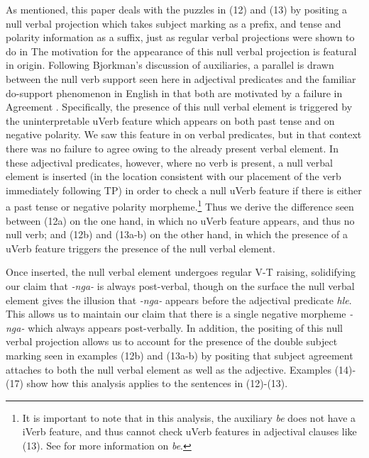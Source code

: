 \documentclass[output=paper]{langsci/langscibook}
\newcommand{\nga}[0]{\textit {-nga- }}
\newcommand{\bee}[0]{\textit {be }}
\begin{document}
As mentioned, this paper deals with the puzzles in (12) and (13) by positing a null verbal projection which takes subject marking as a prefix, and tense and polarity information as a suffix, just as regular verbal projections were shown to do in  The motivation for the appearance of this null verbal projection is featural in origin. Following Bjorkman's discussion of auxiliaries, a parallel is drawn between the null verb support seen here in adjectival predicates and the familiar do-support phenomenon in English in that both are motivated by a failure in Agreement \citep{Bjorkman2011}. Specifically, the presence of this null verbal element is triggered by the uninterpretable uVerb feature which appears on both past tense and on negative polarity. We saw this feature in  on verbal predicates, but in that context there was no failure to agree owing to the already present verbal element. In these adjectival predicates, however, where no verb is present, a null verbal element is inserted (in the location consistent with our placement of the verb immediately following TP) in order to check a null uVerb feature if there is either a past tense or negative polarity morpheme.\footnote{It is important to note that in this analysis, the auxiliary \bee does not have a iVerb feature, and thus cannot check uVerb features in adjectival clauses like (13). See for more information on \textit{be}.} Thus we derive the difference seen between (12a) on the one hand, in which no uVerb feature appears, and thus no null verb; and (12b) and (13a-b) on the other hand, in which the presence of a uVerb feature triggers the presence of the null verbal element.

Once inserted, the null verbal element undergoes regular V-T raising, solidifying our claim that \nga is always post-verbal, though on the surface the null verbal element gives the illusion that \nga appears before the adjectival predicate \textit{hle}. This allows us to maintain our claim that there is a single negative morpheme \nga which always appears post-verbally. In addition, the positing of this null verbal projection allows us to account for the presence of the double subject marking seen in examples (12b) and (13a-b) by positing that subject agreement attaches to both the null verbal element as well as the adjective. Examples (14)-(17) show how this analysis applies to the sentences in (12)-(13).
\end{document}
